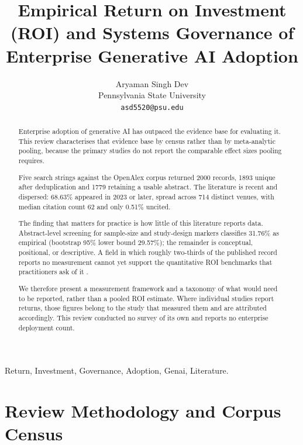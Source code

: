 \documentclass[10pt,journal,compsoc,twocolumn]{IEEEtran}
\begin{document}
\title{Empirical Return on Investment (ROI) and Systems Governance of Enterprise Generative AI Adoption}

\author{
Aryaman Singh Dev\\
Pennsylvania State University \\
\texttt{asd5520@psu.edu}
}

\maketitle

\begin{abstract}
Enterprise adoption of generative AI has outpaced the evidence base for evaluating it. This review characterises that evidence base by census rather than by meta-analytic pooling, because the primary studies do not report the comparable effect sizes pooling requires.

Five search strings against the OpenAlex corpus returned 2000 records, 1893 unique after deduplication and 1779 retaining a usable abstract. The literature is recent and dispersed: 68.63\% appeared in 2023 or later, spread across 714 distinct venues, with median citation count 62 and only 0.51\% uncited.

The finding that matters for practice is how little of this literature reports data. Abstract-level screening for sample-size and study-design markers classifies 31.76\% as empirical (bootstrap 95\% lower bound 29.57\%); the remainder is conceptual, positional, or descriptive. A field in which roughly two-thirds of the published record reports no measurement cannot yet support the quantitative ROI benchmarks that practitioners ask of it \cite{crossref_10_2139_ssrn_6374778}.

We therefore present a measurement framework and a taxonomy of what would need to be reported, rather than a pooled ROI estimate. Where individual studies report returns, those figures belong to the study that measured them and are attributed accordingly. This review conducted no survey of its own and reports no enterprise deployment count.
\end{abstract}

\begin{IEEEkeywords}
Return, Investment, Governance, Adoption, Genai, Literature.
\end{IEEEkeywords}




\section{Review Methodology and Corpus Census}
\end{document}
